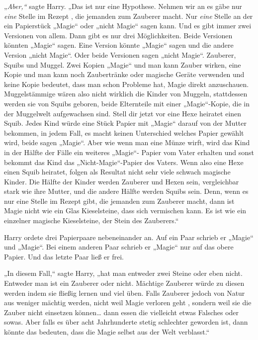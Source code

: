 {„\emph{Aber,“} sagte Harry. „Das ist nur eine Hypothese. Nehmen wir an es gäbe nur \emph{eine} Stelle im Rezept , die jemanden zum Zauberer macht. Nur \emph{eine} Stelle an der ein Papierstück „Magie“ oder „nicht Magie“ sagen kann. Und es gibt immer zwei Versionen von allem. Dann gibt es nur drei Möglichkeiten. Beide Versionen könnten „Magie“ sagen. Eine Version könnte „Magie“ sagen und die andere Version „nicht Magie“. Oder beide Versionen sagen „nicht Magie“. Zauberer, Squibs und Muggel. Zwei Kopien „Magie“ und man kann Zauber wirken, eine Kopie und man kann noch Zaubertränke oder magische Geräte verwenden und keine Kopie bedeutet, dass man schon Probleme hat, Magie direkt anzuschauen. Muggelstämmige wären also nicht wirklich die Kinder von Muggeln, stattdessen werden sie von Squibs geboren, beide Elternteile mit einer „Magie“-Kopie, die in der Muggelwelt aufgewachsen sind. Stell dir jetzt vor eine Hexe heiratet einen Squib. Jedes Kind würde eine Stück Papier mit „Magie“ darauf von der Mutter bekommen, in jedem Fall, es macht keinen Unterschied welches Papier gewählt wird, beide sagen „Magie“. Aber wie wenn man eine Münze wirft, wird das Kind in der Hälfte der Fälle ein weiteres „Magie“- Papier vom Vater erhalten und sonst bekommt das Kind das „Nicht-Magie“-Papier des Vaters. Wenn also eine Hexe einen Squib heiratet, folgen als Resultat nicht sehr viele schwach magische Kinder. Die Hälfte der Kinder werden Zauberer und Hexen sein, vergleichbar stark wie ihre Mutter, und die andere Hälfte werden Squibs sein. Denn, wenn es nur eine Stelle im Rezept gibt, die jemanden zum Zauberer macht, dann ist Magie nicht wie ein Glas Kieselsteine, dass sich vermischen kann. Es ist wie ein einzelner magische Kieselsteine, der Stein des Zauberers.“

Harry ordete drei Papierpaare nebeneinander an. Auf ein Paar schrieb er „Magie“ und „Magie“. Bei einem anderen Paar schrieb er „Magie“ nur auf das obere Papier. Und das letzte Paar ließ er frei.

„In diesem Fall,“ sagte Harry, „hat man entweder zwei Steine oder eben nicht. Entweder man ist ein Zauberer oder nicht. Mächtige Zauberer würde zu diesen werden indem sie fließig lernen und viel üben. Falls Zauberer jedoch von Natur aus weniger mächtig werden, nicht weil Magie verloren geht , sondern weil sie die Zauber nicht einsetzen können… dann essen die vielleicht etwas Falsches oder sowas. Aber falls es über acht Jahrhunderte stetig schlechter geworden ist, dann könnte das bedeuten, dass die Magie selbst aus der Welt verblasst.“

}
